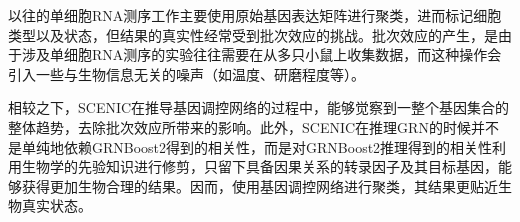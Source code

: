   以往的单细胞RNA测序工作主要使用原始基因表达矩阵进行聚类，进而标记细胞类型以及状态，但结果的真实性经常受到批次效应的挑战。批次效应的产生，是由于涉及单细胞RNA测序的实验往往需要在从多只小鼠上收集数据，而这种操作会引入一些与生物信息无关的噪声（如温度、研磨程度等）。

  相较之下，SCENIC在推导基因调控网络的过程中，能够觉察到一整个基因集合的整体趋势，去除批次效应所带来的影响。此外，SCENIC在推理GRN的时候并不是单纯地依赖GRNBoost2得到的相关性，而是对GRNBoost2推理得到的相关性利用生物学的先验知识进行修剪，只留下具备因果关系的转录因子及其目标基因，能够获得更加生物合理的结果。因而，使用基因调控网络进行聚类，其结果更贴近生物真实状态。

